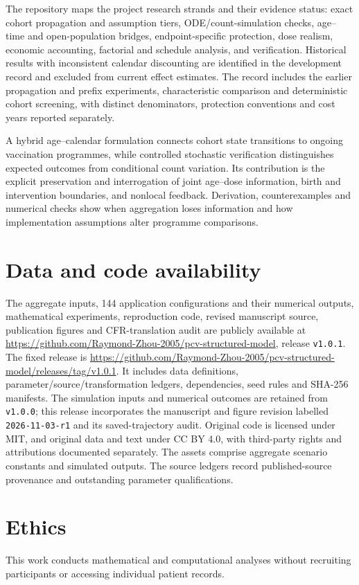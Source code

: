 \documentclass[10pt,letterpaper]{article}
\begin{document}
The repository maps the project research strands and their evidence status: exact cohort propagation and assumption tiers, ODE/count-simulation checks, age--time and open-population bridges, endpoint-specific protection, dose realism, economic accounting, factorial and schedule analysis, and verification. Historical results with inconsistent calendar discounting are identified in the development record and excluded from current effect estimates. The record includes the earlier propagation and prefix experiments, characteristic comparison and deterministic cohort screening, with distinct denominators, protection conventions and cost years reported separately.

A hybrid age--calendar formulation connects cohort state transitions to ongoing vaccination programmes, while controlled stochastic verification distinguishes expected outcomes from conditional count variation. Its contribution is the explicit preservation and interrogation of joint age--dose information, birth and intervention boundaries, and nonlocal feedback. Derivation, counterexamples and numerical checks show when aggregation loses information and how implementation assumptions alter programme comparisons.

\section*{Data and code availability}
The aggregate inputs, 144 application configurations and their numerical outputs, mathematical experiments, reproduction code, revised manuscript source, publication figures and CFR-translation audit are publicly available at \url{https://github.com/Raymond-Zhou-2005/pcv-structured-model}, release \texttt{v1.0.1}. The fixed release is \url{https://github.com/Raymond-Zhou-2005/pcv-structured-model/releases/tag/v1.0.1}. It includes data definitions, parameter/source/transformation ledgers, dependencies, seed rules and SHA-256 manifests. The simulation inputs and numerical outcomes are retained from \texttt{v1.0.0}; this release incorporates the manuscript and figure revision labelled \texttt{2026-11-03-r1} and its saved-trajectory audit. Original code is licensed under MIT, and original data and text under CC BY 4.0, with third-party rights and attributions documented separately. The assets comprise aggregate scenario constants and simulated outputs. The source ledgers record published-source provenance and outstanding parameter qualifications.
\section*{Ethics}
This work conducts mathematical and computational analyses without recruiting participants or accessing individual patient records.


\end{document}
